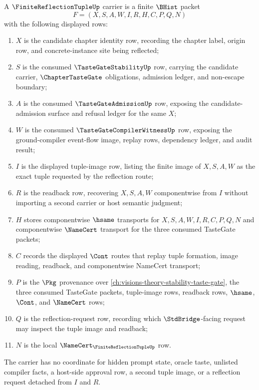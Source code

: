 \begin{definition}
\label{def:finite-reflection-tuple-carrier}
A $\FiniteReflectionTupleUp$ carrier is a finite $\BHist$ packet
$$
F=(X,S,A,W,I,R,H,C,P,Q,N)
$$
with the following displayed rows:
\begin{enumerate}
\item $X$ is the candidate chapter identity row, recording the chapter label, origin row, and concrete-instance site being reflected;
\item $S$ is the consumed $\TasteGateStabilityUp$ row, carrying the candidate carrier, $\ChapterTasteGate$ obligations, admission ledger, and non-escape boundary;
\item $A$ is the consumed $\TasteGateAdmissionUp$ row, exposing the candidate-admission surface and refusal ledger for the same $X$;
\item $W$ is the consumed $\TasteGateCompilerWitnessUp$ row, exposing the ground-compiler event-flow image, replay rows, dependency ledger, and audit result;
\item $I$ is the displayed tuple-image row, listing the finite image of $X,S,A,W$ as the exact tuple requested by the reflection route;
\item $R$ is the readback row, recovering $X,S,A,W$ componentwise from $I$ without importing a second carrier or host semantic judgment;
\item $H$ stores componentwise $\hsame$ transports for $X,S,A,W,I,R,C,P,Q,N$ and componentwise $\NameCert$ transport for the three consumed TasteGate packets;
\item $C$ records the displayed $\Cont$ routes that replay tuple formation, image reading, readback, and componentwise NameCert transport;
\item $P$ is the $\Pkg$ provenance over \autoref{ch:visions-theory-stability-taste-gate}, the three consumed TasteGate packets, tuple-image rows, readback rows, $\hsame$, $\Cont$, and $\NameCert$ rows;
\item $Q$ is the reflection-request row, recording which $\StdBridge$-facing request may inspect the tuple image and readback;
\item $N$ is the local $\NameCert_{\FiniteReflectionTupleUp}$ row.
\end{enumerate}
The carrier has no coordinate for hidden prompt state, oracle taste, unlisted compiler facts, a host-side approval row, a second tuple image, or a reflection request detached from $I$ and $R$.
\end{definition}

